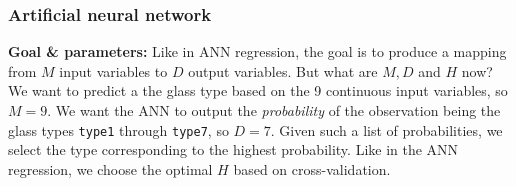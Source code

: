 \subsubsection{Artificial neural network}

\textbf{Goal \& parameters:} Like in ANN regression, the goal is to produce a mapping from $M$ input variables to $D$ output variables. But what are $M, D$ and $H$ now? We want to predict a the glass type based on the 9 continuous input variables, so $M = 9$. We want the ANN to output the \textit{probability} of the observation being the glass types \texttt{type1} through \texttt{type7}, so $D=7$. Given such a list of probabilities, we select the type corresponding to the highest probability. Like in the ANN regression, we choose the optimal $H$ based on cross-validation.


